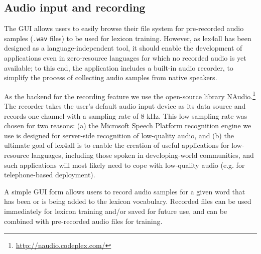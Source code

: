 \documentclass[11pt]{article}
\begin{document}
\subsection{Audio input and recording}
\label{sec:recording}


The GUI allows users to easily browse their file system for pre-recorded audio samples (\texttt{.wav} files) to be used for lexicon training. However, as lex4all has been designed as a language-independent tool, it should enable the development of applications even in zero-resource languages for which no recorded audio is yet available; to this end, the application includes a built-in audio recorder, to simplify the process of collecting audio samples from native speakers.

As the backend for the recording feature we use the open-source library NAudio.\footnote{\url{http://naudio.codeplex.com/}}
The recorder takes the user's default audio input device as its data source and records one channel with a sampling rate of 8 kHz. 
This low sampling rate was chosen for two reasons: (a) the Microsoft Speech Platform recognition engine we use is designed for server-side recognition of low-quality audio, and (b) the ultimate goal of lex4all is to enable the creation of useful applications for low-resource languages, including those spoken in developing-world communities, and such applications will most likely need to cope with low-quality audio (e.g. for telephone-based deployment).

A simple GUI form allows users to record audio samples for a given word that has been or is being added to the lexicon vocabulary. Recorded files can be used immediately for lexicon training and/or saved for future use, and can be combined with pre-recorded audio files for training. 
\end{document}
